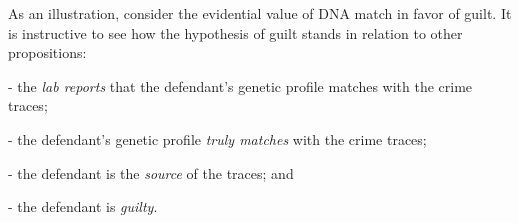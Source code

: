 \documentclass[10pt]{article}
\begin{document}
As an illustration, consider the evidential value of DNA match in favor of guilt. %
It is instructive to see how the hypothesis of guilt stands in  
relation to other propositions: %

- the \textit{lab reports} that the defendant's 
genetic profile matches with the crime traces;

- the defendant's genetic profile \textit{truly matches} with the crime traces; 

- the defendant is the \textit{source} of the traces; and




- the defendant is \textit{guilty}.
\end{document}
